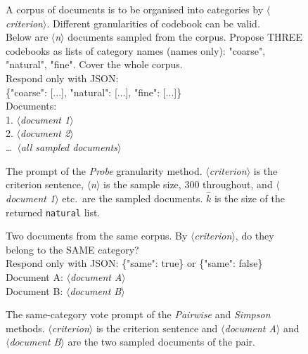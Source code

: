 \documentclass[11pt,a4paper,oneside]{report}
\newcommand{\ph}[1]{\textcolor{blue!60!black}{\rmfamily\itshape $\langle$#1$\rangle$}}
\begin{document}
\begin{figure}[htbp]
\begin{promptbox}
\small\ttfamily
A corpus of documents is to be organised into categories by \ph{criterion}. Different granularities of codebook can be valid.\\[4pt]
Below are \ph{n} documents sampled from the corpus. Propose THREE codebooks as lists of category names (names only): "coarse", "natural", "fine". Cover the whole corpus.\\[4pt]
Respond only with JSON:\\
\{"coarse": [...], "natural": [...], "fine": [...]\}\\[4pt]
Documents:\\
1. \ph{document 1}\\
2. \ph{document 2}\\
\ldots\ \ph{all sampled documents}
\end{promptbox}
\caption[Probe granularity prompt]{The prompt of the \textit{Probe} granularity method. \ph{criterion} is the criterion sentence, \ph{n} is the sample size, 300 throughout, and \ph{document 1} etc.\ are the sampled documents. $\hat{k}$ is the size of the returned \texttt{natural} list.}
\label{fig:prompt-probe}
\end{figure}

\begin{figure}[htbp]
\begin{promptbox}
\small\ttfamily
Two documents from the same corpus. By \ph{criterion}, do they belong to the SAME category?\\
Respond only with JSON: \{"same": true\} or \{"same": false\}\\[4pt]
Document A: \ph{document A}\\[4pt]
Document B: \ph{document B}
\end{promptbox}
\caption[Same-category vote prompt]{The same-category vote prompt of the \textit{Pairwise} and \textit{Simpson} methods. \ph{criterion} is the criterion sentence and \ph{document A} and \ph{document B} are the two sampled documents of the pair.}
\label{fig:prompt-same}
\end{figure}
\end{document}
